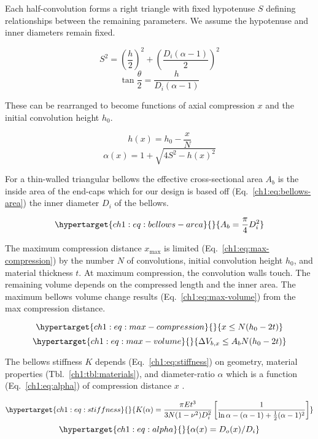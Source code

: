 Each half-convolution forms a right triangle with fixed hypotenuse \(S\)
defining relationships between the remaining parameters. We assume the
hypotenuse and inner diameters remain fixed.

\[ 
S^2 = \left( \frac{h}{2} \right)^2 +   
    \left(\frac{D_i (\alpha-1)}{2} \right)^2   
\] \[ 
\tan{\frac{\theta}{2}} = \frac{h}{D_i (\alpha-1)}   
\]

These can be rearranged to become functions of axial compression \(x\)
and the initial convolution height \(h_0\).

\[ 
h(x) = h_0 - \frac{x}{N}   
\] \[ 
\alpha(x) = 1 + \sqrt{4S^2 - h(x)^2}   
\]

For a thin-walled triangular bellows the effective cross-sectional area
\(A_b\) is the inside area of the end-caps which for our design is based
off (Eq.~\ref{ch1:eq:bellows-area}) the inner diameter \(D_i\) of the
bellows.

\begin{equation}\protect\hypertarget{ch1:eq:bellows-area}{}{A_b = \frac{\pi}{4} D_i^2
}\label{ch1:eq:bellows-area}\end{equation}

The maximum compression distance \(x_\text{max}\) is limited
(Eq.~\ref{ch1:eq:max-compression}) by the number \(N\) of convolutions,
initial convolution height \(h_0\), and material thickness \(t\). At
maximum compression, the convolution walls touch. The remaining volume
depends on the compressed length and the inner area. The maximum bellows
volume change results (Eq.~\ref{ch1:eq:max-volume}) from the max compression
distance.

\begin{equation}\protect\hypertarget{ch1:eq:max-compression}{}{ 
x \le N(h_0 - 2t)   
}\label{ch1:eq:max-compression}\end{equation}
\begin{equation}\protect\hypertarget{ch1:eq:max-volume}{}{
\Delta V_{b,x} \le A_b  N(h_0 - 2t)   
}\label{ch1:eq:max-volume}\end{equation}

The bellows stiffness \(K\) depends (Eq.~\ref{ch1:eq:stiffness}) on
geometry, material properties (Tbl.~\ref{ch1:tbl:materials}), and
diameter-ratio \(\alpha\) which is a function (Eq.~\ref{ch1:eq:alpha}) of
compression distance \(x\) \cite{wang2020mechanoreception}.

\begin{equation}\protect\hypertarget{ch1:eq:stiffness}{}{ 
K(\alpha) = \frac{\pi E t^3}{3N(1-\nu^2)D_i^2} \left[
\frac{1}{\ln{\alpha} - (\alpha-1) + \frac{1}{2}(\alpha-1)^2}
\right]   
}\label{ch1:eq:stiffness}\end{equation}
\begin{equation}\protect\hypertarget{ch1:eq:alpha}{}{ 
\alpha(x) = D_o(x)/D_i   
}\label{ch1:eq:alpha}\end{equation}

